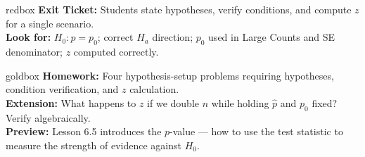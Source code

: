 \documentclass[10pt]{article}
\begin{document}
\begin{skillbox}{redbox}
    \textbf{Exit Ticket:} Students state hypotheses, verify conditions, and compute $z$ for a
    single scenario. \\[4pt]
    \textbf{Look for:} $H_0: p = p_0$; correct $H_a$ direction; $p_0$ used in Large Counts
    and SE denominator; $z$ computed correctly.
\end{skillbox}

\begin{skillbox}{goldbox}
    \textbf{Homework:} Four hypothesis-setup problems requiring hypotheses, condition
    verification, and $z$ calculation. \\[4pt]
    \textbf{Extension:} What happens to $z$ if we double $n$ while holding $\hat p$ and $p_0$
    fixed? Verify algebraically. \\[4pt]
    \textbf{Preview:} Lesson 6.5 introduces the $p$-value --- how to use the test statistic
    to measure the strength of evidence against $H_0$.
\end{skillbox}
\end{document}
